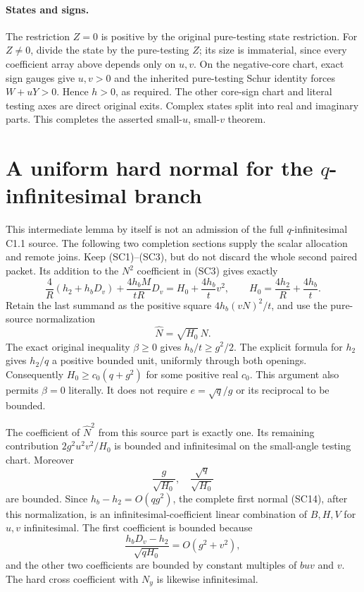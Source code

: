\paragraph{States and signs.}
The restriction $Z=0$ is positive by the original pure-testing state
restriction. For $Z\ne0$, divide the state by the pure-testing $Z$;
its size is immaterial, since every coefficient array above depends
only on $u,v$. On the negative-core chart, exact sign gauges give
$u,v>0$ and the inherited pure-testing Schur identity forces
$W+uY>0$. Hence $h>0$, as required. The other core-sign chart and
literal testing axes are direct original exits. Complex states
split into real and imaginary parts. This completes the asserted
small-$u$, small-$v$ theorem.


\section{\texorpdfstring{A uniform hard normal for the $q$-infinitesimal branch}{A uniform hard normal for the q-infinitesimal branch}}
\label{component:p7d43f3fccb7d}

This intermediate lemma by itself is not an admission of the full
$q$-infinitesimal C1.1 source. The following two completion sections
supply the scalar allocation and remote joins. Keep (SC1)--(SC3), but do
not discard the whole second paired packet. Its addition to the
$N^2$ coefficient in (SC3) gives exactly
\[
 \frac4R(h_2+h_bD_v)+\frac{4h_bM}{tR}D_v
       =H_0+\frac{4h_b}{t}v^2,
 \qquad H_0=\frac{4h_2}{R}+\frac{4h_b}{t}.
\]
Retain the last summand as the positive square
$4h_b(vN)^2/t$, and use the pure-source normalization
\[
                         \widehat N=\sqrt{H_0}\,N.
\]
The exact original inequality $\beta\ge0$ gives
$h_b/t\ge g^2/2$. The explicit formula for $h_2$ gives
$h_2/q$ a positive bounded unit, uniformly through both openings.
Consequently $H_0\ge c_0(q+g^2)$ for some positive real $c_0$.
This argument also permits $\beta=0$ literally. It does not require
$e=\sqrt q/g$ or its reciprocal to be bounded.

The coefficient of $\widehat N^2$ from this source part is exactly
one. Its remaining contribution $2g^2u^2v^2/H_0$ is bounded and
infinitesimal on the small-angle testing chart. Moreover
\[
 \frac{g}{\sqrt{H_0}},\quad
 \frac{\sqrt q}{\sqrt{H_0}}
\]
are bounded. Since $h_b-h_2=O(qg^2)$, the complete first normal
(SC14), after this normalization, is an infinitesimal-coefficient
linear combination of $B,H,V$ for $u,v$ infinitesimal. The first
coefficient is bounded because
\[
 \frac{h_bD_v-h_2}{\sqrt{qH_0}}
            =O(g^2+v^2),
\]
and the other two coefficients are bounded by constant multiples of
$buv$ and $v$. The hard cross coefficient with $N_y$ is likewise
infinitesimal.

